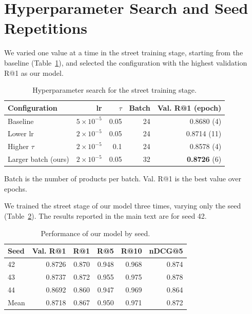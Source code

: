 \documentclass[sigconf,nonacm]{acmart}
\begin{document}



\appendix

\section{Hyperparameter Search and Seed Repetitions}
\label{app:hp}

We varied one value at a time in the street training stage, starting from the baseline (Table~\ref{tab:hp}), and selected the configuration with the highest validation R@1 as our model.

\begin{table}[ht]
  \caption{Hyperparameter search for the street training stage.}
  \label{tab:hp}
  \small
  \begin{tabular}{lrrrr}
    \toprule
    Configuration & lr & $\tau$ & Batch & Val. R@1 (epoch) \\
    \midrule
    Baseline & $5\times10^{-5}$ & 0.05 & 24 & 0.8680 (4) \\
    Lower lr & $2\times10^{-5}$ & 0.05 & 24 & 0.8714 (11) \\
    Higher $\tau$ & $2\times10^{-5}$ & 0.1 & 24 & 0.8578 (4) \\
    Larger batch (ours) & $2\times10^{-5}$ & 0.05 & 32 & \textbf{0.8726} (6) \\
    \bottomrule
  \end{tabular}
  \par\smallskip
  \footnotesize Batch is the number of products per batch. Val. R@1 is the best value over epochs.
\end{table}

We trained the street stage of our model three times, varying only the seed (Table~\ref{tab:seeds}). The results reported in the main text are for seed 42.

\begin{table}[ht]
  \caption{Performance of our model by seed.}
  \label{tab:seeds}
  \small
  \begin{tabular}{lrrrrr}
    \toprule
    Seed & Val. R@1 & R@1 & R@5 & R@10 & nDCG@5 \\
    \midrule
    42 & 0.8726 & 0.870 & 0.948 & 0.968 & 0.874 \\
    43 & 0.8737 & 0.872 & 0.955 & 0.975 & 0.878 \\
    44 & 0.8692 & 0.860 & 0.947 & 0.969 & 0.864 \\
    Mean & 0.8718 & 0.867 & 0.950 & 0.971 & 0.872 \\
    \bottomrule
  \end{tabular}
\end{table}
\end{document}
